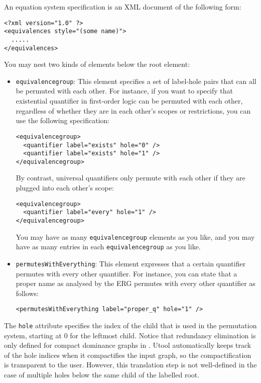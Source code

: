 An equation system specification is an XML document of the following
form:

\begin{verbatim}
<?xml version="1.0" ?>
<equivalences style="(some name)">   
  .....
</equivalences>
\end{verbatim}

You may nest two kinds of elements below the root element:
\begin{itemize}
\item \verb?equivalencegroup?: This element specifies a set of
label-hole pairs that can all be permuted with each other. For
instance, if you want to specify that existential quantifier in
first-order logic can be permuted with each other, regardless of
whether they are in each other's scopes or restrictions, you can use
the following specification:
\begin{verbatim}
<equivalencegroup>
  <quantifier label="exists" hole="0" />
  <quantifier label="exists" hole="1" />
</equivalencegroup>
\end{verbatim}

By contrast, universal quantifiers only permute with each other if
they are plugged into each other's scope:
\begin{verbatim}
<equivalencegroup>
  <quantifier label="every" hole="1" />
</equivalencegroup>
\end{verbatim}

You may have as many \verb?equivalencegroup? elements as you
like, and you may have as many entries in each \verb?equivalencegroup?
as you like.

\item \verb?permutesWithEverything?: This element expresses that a
certain quantifier permutes with every other quantifier. For instance,
you can state that a proper name as analysed by the ERG permutes with
every other quantifier as follows:

\begin{verbatim}
<permutesWithEverything label="proper_q" hole="1" />
\end{verbatim}
\end{itemize}

The \verb?hole? attribute specifies the index of the child that is
used in the permutation system, starting at 0 for the leftmost
child. Notice that redundancy elimination is only defined for compact
dominance graphs in \cite{koller06}. Utool automatically keeps track
of the hole indices when it compactifies the input graph, so the
compactification is transparent to the user. However, this translation
step is not well-defined in the case of multiple holes below the same
child of the labelled root.

